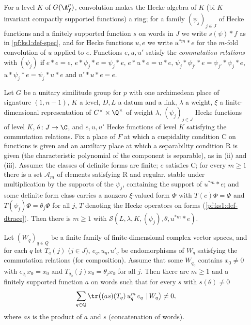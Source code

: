 For a level $K$ of $G(\A_f^p)$, convolution makes the Hecke algebra of $K$ (bi-$K$-invariant compactly supported functions) a ring;
for a family $(\psi_j)_{j\in J}$ of Hecke functions and a finitely supported function $s$ on words in $J$ we write $s(\psi)*f$ as in
\cref{pf:ks1:def-spec}, and for Hecke functions $u,e$ we write $u^{*m}*e$ for the $m$-fold convolution of $u$ applied to $e$. Functions $e,u,u'$
satisfy the \emph{commutation relations} with $(\psi_j)$ if $e*e=e$, $e*\psi_j*e=\psi_j*e$, $e*u*e=u*e$, $\psi_j*\psi_{j'}*e=\psi_{j'}*\psi_j*e$,
$u*\psi_j*e=\psi_j*u*e$ and $u'*u*e=e$.

\begin{proposition}\label{pf:geo:specoff}
Let $G$ be a unitary similitude group for $p$ with one archimedean place of signature $(1,n-1)$, $K$ a level, $D,L$ a datum and a link,
$\lambda$ a weight, $\xi$ a finite-dimensional representation of $C^\times\times\Q^\times$ of weight $\lambda$, $(\psi_j)_{j\in J}$ Hecke functions of
level $K$, $\theta\colon J\to\C$, and $e,u,u'$ Hecke functions of level $K$ satisfying the commutation relations. Fix a place of $F$ at which a
cuspidality condition $\mathrm{C}$ on functions is given and an auxiliary place at which a separability condition $\mathrm R$ is given
(the characteristic polynomial of the component is separable), as in (ii) and (iii). Assume: the classes of definite forms are finite;
$e$ satisfies $\mathrm{C}$; for every $m\ge1$ there is a set $\mathcal A_m$ of elements satisfying $\mathrm R$ and regular, stable under
multiplication by the supports of the $\psi_j$, containing the support of $u^{*m}*e$; and some definite form class carries a nonzero
$\xi$-valued form $\Phi$ with $T(e)\Phi=\Phi$ and $T(\psi_j)\Phi=\theta_j\Phi$ for all $j$, $T$ denoting the Hecke operators on forms
(\cref{pf:ks1:def-dtrace}). Then there is $m\ge1$ with $\mathcal S(L,\lambda,K,(\psi_j),\theta,u^{*m}*e)$.
\end{proposition}

\begin{lemma}\label{pf:geo:specalg}
Let $(W_q)_{q\in Q}$ be a finite family of finite-dimensional complex vector spaces, and for each $q$ let $T_q(j)$ ($j\in J$), $e_q,u_q,u'_q$ be
endomorphisms of $W_q$ satisfying the commutation relations (for composition). Assume that some $W_{q_0}$ contains $x_0\ne0$ with
$e_{q_0}x_0=x_0$ and $T_{q_0}(j)x_0=\theta_jx_0$ for all $j$. Then there are $m\ge1$ and a finitely supported function $a$ on words such that
for every $s$ with $s(\theta)\ne0$
\[
  \sum_{q\in Q}\tr\bigl((as)(T_q)\,u_q^m\,e_q\mid W_q\bigr)\ne0,
\]
where $as$ is the product of $a$ and $s$ (concatenation of words).
\end{lemma}

